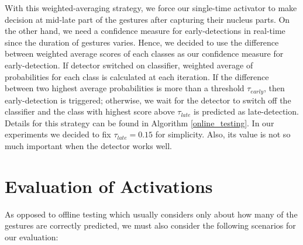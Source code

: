 With this weighted-averaging strategy, we force our single-time activator to make decision at mid-late part of the gestures after capturing their nucleus parts. On the other hand, we need a confidence measure for early-detections in real-time since the duration of gestures varies. Hence, we decided to use the difference between weighted average scores of each classes as our confidence measure for early-detection. If detector switched on classifier, weighted average of probabilities for each class is calculated at each iteration. If the difference between two highest average probabilities is more than a threshold $\tau_{early}$, then early-detection is triggered; otherwise, we wait for the detector to switch off the classifier and the class with highest score above $\tau_{late}$ is predicted as late-detection. Details for this strategy can be found in Algorithm \ref{online_testing}. In our experiments we decided to fix $\tau_{late} = 0.15$ for simplicity. Also, its value is not so much important when the detector works well.\\

\section{Evaluation of Activations}
As opposed to offline testing which usually considers only about how many of the gestures are correctly predicted, we must also consider the following scenarios for our evaluation:

